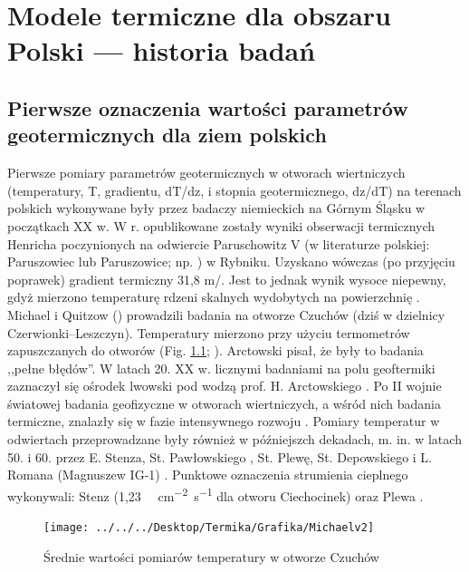 \documentclass[11.5pt,twoside]{report}
\newcommand{\ct}[1]{\ignorespaces} %
\begin{document}

\chapter{Modele termiczne dla obszaru Polski --- historia badań}

\section{Pierwsze oznaczenia wartości parametrów geotermicznych dla ziem polskich}

Pierwsze pomiary parametrów geotermicznych w otworach wiertniczych (temperatury, T, gradientu, dT/dz, i stopnia geotermicznego, dz/dT) na terenach polskich wykonywane były przez badaczy niemieckich na Górnym Śląsku w początkach XX w. W \citeyear{Henrich.1904} r. opublikowane zostały wyniki obserwacji termicznych Henricha poczynionych na odwiercie Paruschowitz V (w literaturze polskiej: Paruszowiec lub Paruszowice; np. \cite{Plewa.1966,Stenz.1936}) w Rybniku. Uzyskano wówczas (po przyjęciu poprawek) gradient termiczny 31,8 m/{\textcelsius}. Jest to jednak wynik wysoce niepewny, gdyż mierzono temperaturę rdzeni skalnych wydobytych na powierzchnię \parencite{Maj.2010,Rudzki.1909,Henrich.1904}. Michael i Quitzow (\citeyear{Michael.1910}) prowadzili badania na otworze Czuchów (dziś w dzielnicy Czerwionki--Leszczyn). Temperatury mierzono przy użyciu termometrów zapuszczanych do otworów (Fig. \ref{michael}; \cite{Michael.1910}). Arctowski \parencite{Arctowski.1923a} pisał, że były to badania ,,pełne błędów''. W latach 20. XX w. licznymi badaniami na polu geoftermiki zaznaczył się ośrodek lwowski pod wodzą prof. H. Arctowskiego \parencite{Plewa.1966,Maj.2010}. Po II wojnie światowej badania geofizyczne w otworach wiertniczych, a wśród nich badania termiczne, znalazły się w fazie intensywnego rozwoju \parencite{Plewa.1994}. Pomiary temperatur w odwiertach przeprowadzane były również w pó\'{z}niejszch dekadach, m. in. w latach 50. i 60. przez E. Stenza, St. Pawłowskiego \ct{(Łeba)}, St. Plewę, St. Depowskiego i L. Romana (Magnuszew IG-1) \parencite{Plewa.1966,Roman.1962,Stenz.1936}. \ct{dopisac gdzie były badania} Punktowe oznaczenia strumienia cieplnego wykonywali: Stenz \ct{\citeyear{Stenz.1954}} (1,23 \si[sticky-per]{\micro\calorie.cm^{-2}.s^{-1}} dla otworu Ciechocinek) oraz Plewa \ct{parencite{Plewa.1961,Plewa.1963a,Plewa.1963b,Plewa.1965,Plewa.1966}}. 

\begin{figure}[h]
	\centering
	\texttt{[image: ../../../Desktop/Termika/Grafika/Michaelv2]}
	\caption{Średnie wartości pomiarów temperatury w otworze Czuchów \parencite{Michael.1910}}
	\label{michael}
\end{figure}
	
\end{document}
